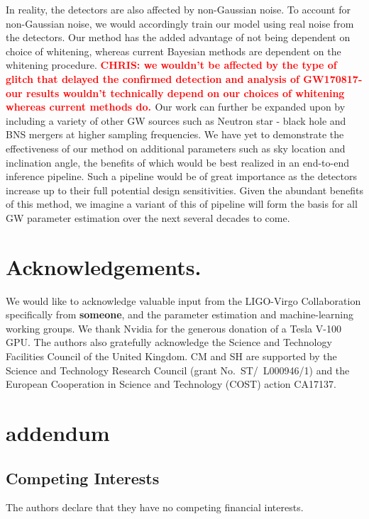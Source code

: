 \documentclass[%
showpacs,
 amsmath,amssymb,
 aps,
 twocolumn,
 prl,
 reprint,
floatfix,
]{revtex4-1}
\newcommand{\chris}[1]{\textbf{\textcolor{red}{CHRIS: #1}}}
\begin{document}
In reality, the detectors are also affected by non-Gaussian noise. 
To account for non-Gaussian noise, we would accordingly train our model using real noise from the detectors. Our method has the added 
advantage of not being dependent on choice of whitening, whereas 
current Bayesian methods are dependent on the whitening procedure.   
\chris{we wouldn't be affected by the type of
glitch that delayed the confirmed detection and analysis of GW170817- our
results wouldn't technically depend on our choices of whitening whereas current
methods do. } Our work can further be expanded upon by including a variety of
other \ac{GW} sources such as Neutron star - black hole and \ac{BNS} mergers at higher
sampling frequencies. We have yet to demonstrate the effectiveness of our method
on additional parameters such as sky location and inclination angle, the
benefits of which would be best realized in an end-to-end inference pipeline.
Such a pipeline would be of great importance as the detectors increase up to
their full potential design sensitivities. Given the abundant 
benefits of this method, we imagine a variant of 
this of pipeline will form the basis for all \ac{GW} parameter 
estimation over the next several decades to come.

%
%
\section{Acknowledgements.}
%
We would like to acknowledge valuable input from the LIGO-Virgo Collaboration
specifically from {\textbf{someone}}, and the parameter estimation and
machine-learning working groups. We thank Nvidia for the generous 
donation of a Tesla V-100 GPU. The authors also gratefully acknowledge the
Science and Technology Facilities Council of the United Kingdom. CM and SH are
supported by the Science and Technology Research Council (grant
No.~ST/~L000946/1) and the European Cooperation in Science and Technology
(COST) action CA17137.


\section{addendum}
 \subsection{Competing Interests} 
    The authors declare that they have no competing financial interests.
\end{document}
